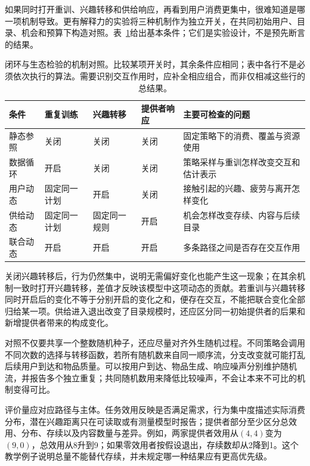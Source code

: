 如果同时打开重训、兴趣转移和供给响应，再看到用户消费更集中，很难知道是哪一项机制导致。更有解释力的实验将三种机制作为独立开关，在共同初始用户、目录、机会和预算下构造对照。表~\ref{tab:rs-feedback-controls}给出基本条件；它们是实验设计，不是预先断言的结果。

\begin{table}[htbp]
 \centering
 \small
 \begin{tabularx}{\linewidth}{@{}p{22mm}p{23mm}p{23mm}p{23mm}X@{}}
  \toprule
  条件 & 重复训练 & 兴趣转移 & 提供者响应 & 主要可检查的问题 \\
  \midrule
  静态参照 & 关闭 & 关闭 & 关闭 & 固定策略下的消费、覆盖与资源使用 \\
  数据循环 & 开启 & 关闭 & 关闭 & 策略采样与重训怎样改变交互和估计表示 \\
  用户动态 & 固定同一计划 & 开启 & 关闭 & 接触引起的兴趣、疲劳与离开怎样变化 \\
  供给动态 & 固定同一计划 & 固定同一规则 & 开启 & 机会怎样改变存续、内容与后续目录 \\
  联合动态 & 开启 & 开启 & 开启 & 多条路径之间是否存在交互作用 \\
  \bottomrule
 \end{tabularx}
 \caption{闭环与生态检验的机制对照。比较某项开关时，其余条件应相同；表中各行不是必须依次执行的算法。需要识别交互作用时，应补全相应组合，而非仅相减这些行的总结果。}
 \label{tab:rs-feedback-controls}
\end{table}

关闭兴趣转移后，行为仍然集中，说明无需偏好变化也能产生这一现象；在其余机制一致时打开兴趣转移，差值才反映该模型中这项动态的贡献。若重训与兴趣转移同时开启后的变化不等于分别开启的变化之和，便存在交互，不能把联合变化全部归给某一项。供给进入退出改变了目录规模时，还应区分同一初始提供者的后果和新增提供者带来的构成变化。

对照不仅要共享一个整数随机种子，还应尽量对齐外生随机过程。不同策略会调用不同次数的选择与转移函数，若所有随机数来自同一顺序流，分支改变就可能打乱后续用户到达和物品质量。可以按用户到达、物品生成、响应噪声分别维护随机流，并报告多个独立重复；共同随机数用来降低比较噪声，不会让本来不可比的机制变得可比。

评价量应对应路径与主体。任务效用反映是否满足需求，行为集中度描述实际消费分布，潜在兴趣距离只在可读取或有测量模型时报告；提供者部分至少区分总效用、分布、存续以及内容数量与差异。例如，两家提供者效用从$(4,4)$变为$(9,0)$，总效用从8升到9；如果零效用者按假设退出，存续数却从2降到1。这个教学例子说明总量不能替代存续，并未规定哪一种结果应有更高优先级。


